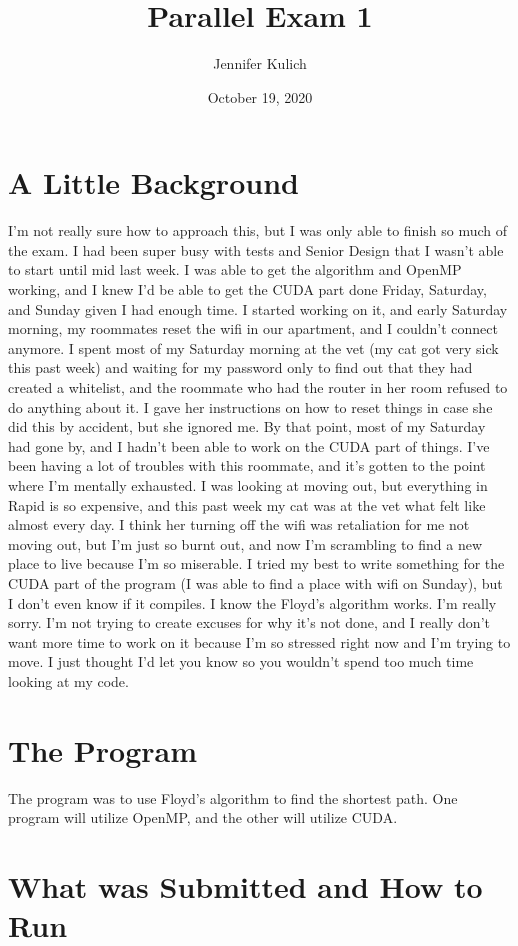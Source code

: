 \documentclass{article}
\title{Parallel Exam 1}
\author{Jennifer Kulich }
\date{October 19, 2020}
\begin{document}
\maketitle
\section{A Little Background}
I'm not really sure how to approach this, but I was only able to finish so much of the exam. I had been super busy with tests and Senior Design that I wasn't able to start until mid last week. I was able to get the algorithm and OpenMP working, and I knew I'd be able to get the CUDA part done Friday, Saturday, and Sunday given I had enough time. I started working on it, and early Saturday morning, my roommates reset the wifi in our apartment, and I couldn't connect anymore. I spent most of my Saturday morning at the vet (my cat got very sick this past week) and waiting for my password only to find out that they had created a whitelist, and the roommate who had the router in her room refused to do anything about it. I gave her instructions on how to reset things in case she did this by accident, but she ignored me. By that point, most of my Saturday had gone by, and I hadn't been able to work on the CUDA part of things. I've been having a lot of troubles with this roommate, and it's gotten to the point where I'm mentally exhausted. I was looking at moving out, but everything in Rapid is so expensive, and this past week my cat was at the vet what felt like almost every day. I think her turning off the wifi was retaliation for me not moving out, but I'm just so burnt out, and now I'm scrambling to find a new place to live because I'm so miserable. I tried my best to write something for the CUDA part of the program (I was able to find a place with wifi on Sunday), but I don't even know if it compiles. I know the Floyd's algorithm works. 
I'm really sorry. I'm not trying to create excuses for why it's not done, and I really don't want more time to work on it because I'm so stressed right now and I'm trying to move. I just thought I'd let you know so you wouldn't spend too much time looking at my code.

\section{The Program}
The program was to use Floyd's algorithm to find the shortest path. One program will utilize OpenMP, and the other will utilize CUDA. 

\section{What was Submitted and How to Run}
\end{document}
